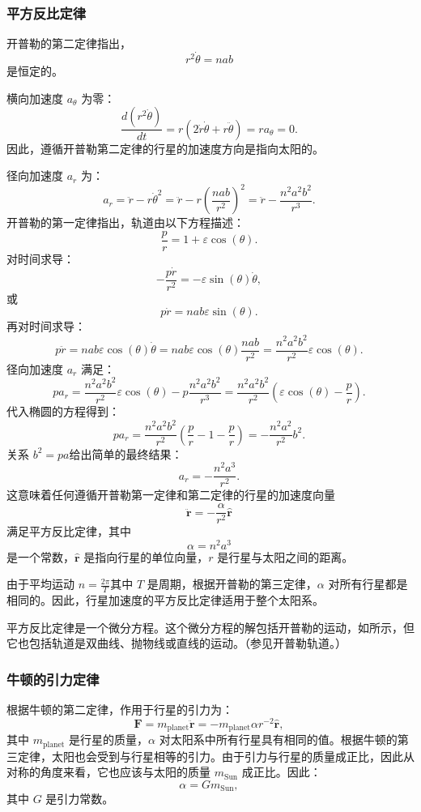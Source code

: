 \subsubsection{平方反比定律}  
开普勒的第二定律指出，  
\[
r^2 \dot{\theta} = nab~
\]
是恒定的。

横向加速度 \( a_{\theta} \) 为零：
\[
\frac{d\left(r^2 \dot{\theta}\right)}{dt} = r \left( 2 \dot{r} \dot{\theta} + r \ddot{\theta} \right) = r a_{\theta} = 0.~
\]
因此，遵循开普勒第二定律的行星的加速度方向是指向太阳的。

径向加速度  \( a_r \) 为：
\[
a_r = \ddot{r} - r \dot{\theta}^2 = \ddot{r} - r \left( \frac{nab}{r^2} \right)^2 = \ddot{r} - \frac{n^2 a^2 b^2}{r^3}.~
\]
开普勒的第一定律指出，轨道由以下方程描述：
\[
\frac{p}{r} = 1 + \varepsilon \cos(\theta).~
\]
对时间求导：
\[
-\frac{p \dot{r}}{r^2} = -\varepsilon \sin(\theta) \dot{\theta},~
\]
或
\[
p \dot{r} = nab \varepsilon \sin(\theta).~
\]
再对时间求导：
\[
p \ddot{r} = nab \varepsilon \cos(\theta) \dot{\theta} = nab \varepsilon \cos(\theta) \frac{nab}{r^2} = \frac{n^2 a^2 b^2}{r^2} \varepsilon \cos(\theta).~
\]
径向加速度 \( a_r \) 满足：
\[
p a_r = \frac{n^2 a^2 b^2}{r^2} \varepsilon \cos(\theta) - p \frac{n^2 a^2 b^2}{r^3} = \frac{n^2 a^2 b^2}{r^2} \left( \varepsilon \cos(\theta) - \frac{p}{r} \right).~
\]
代入椭圆的方程得到：
\[
p a_r = \frac{n^2 a^2 b^2}{r^2} \left( \frac{p}{r} - 1 - \frac{p}{r} \right) = - \frac{n^2 a^2}{r^2} b^2.~
\]
关系 \(b^2 = pa\)给出简单的最终结果：
\[
a_r = -\frac{n^2 a^3}{r^2}.~
\]
这意味着任何遵循开普勒第一定律和第二定律的行星的加速度向量  
\[
\mathbf{\ddot{r}} = -\frac{\alpha}{r^2} \hat{\mathbf{r}}~
\]
满足平方反比定律，其中  
\[
\alpha = n^2 a^3~
\]
是一个常数，\(\hat{\mathbf{r}}\) 是指向行星的单位向量，\(r\) 是行星与太阳之间的距离。

由于平均运动 \(n = \frac{2\pi}{T}\)其中 \(T\) 是周期，根据开普勒的第三定律，\(\alpha\) 对所有行星都是相同的。因此，行星加速度的平方反比定律适用于整个太阳系。

平方反比定律是一个微分方程。这个微分方程的解包括开普勒的运动，如所示，但它也包括轨道是双曲线、抛物线或直线的运动。（参见开普勒轨道。）
\subsubsection{牛顿的引力定律}

根据牛顿的第二定律，作用于行星的引力为：
\[
\mathbf{F} = m_{\text{planet}} \mathbf{\ddot{r}} = -m_{\text{planet}} \alpha r^{-2} \hat{\mathbf{r}},~
\]
其中 \( m_{\text{planet}} \) 是行星的质量，\(\alpha\) 对太阳系中所有行星具有相同的值。根据牛顿的第三定律，太阳也会受到与行星相等的引力。由于引力与行星的质量成正比，因此从对称的角度来看，它也应该与太阳的质量 \( m_{\text{Sun}} \) 成正比。因此：
\[
\alpha = G m_{\text{Sun}},~
\]
其中 \( G \) 是引力常数。

